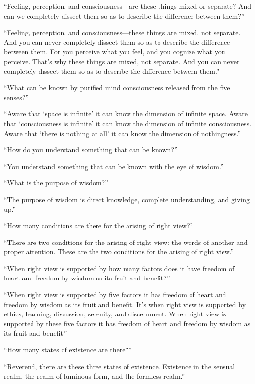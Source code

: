 \documentclass[12pt,openany]{book}%
\begin{document}
“Feeling, perception, and consciousness—are these things mixed or separate? And can we completely dissect them so as to describe the difference between them?” 

“Feeling, perception, and consciousness—these things are mixed, not separate. And you can never completely dissect them so as to describe the difference between them. For you perceive what you feel, and you cognize what you perceive. That’s why these things are mixed, not separate. And you can never completely dissect them so as to describe the difference between them.” 

“What can be known by purified mind consciousness released from the five senses?” 

“Aware that ‘space is infinite’ it can know the dimension of infinite space. Aware that ‘consciousness is infinite’ it can know the dimension of infinite consciousness. Aware that ‘there is nothing at all’ it can know the dimension of nothingness.” 

“How do you understand something that can be known?” 

“You understand something that can be known with the eye of wisdom.” 

“What is the purpose of wisdom?” 

“The purpose of wisdom is direct knowledge, complete understanding, and giving up.” 

“How many conditions are there for the arising of right view?” 

“There are two conditions for the arising of right view: the words of another and proper attention. These are the two conditions for the arising of right view.” 

“When right view is supported by how many factors does it have freedom of heart and freedom by wisdom as its fruit and benefit?” 

“When right view is supported by five factors it has freedom of heart and freedom by wisdom as its fruit and benefit. It’s when right view is supported by ethics, learning, discussion, serenity, and discernment. When right view is supported by these five factors it has freedom of heart and freedom by wisdom as its fruit and benefit.” 

“How many states of existence are there?” 

“Reverend, there are these three states of existence. Existence in the sensual realm, the realm of luminous form, and the formless realm.” 
\end{document}
